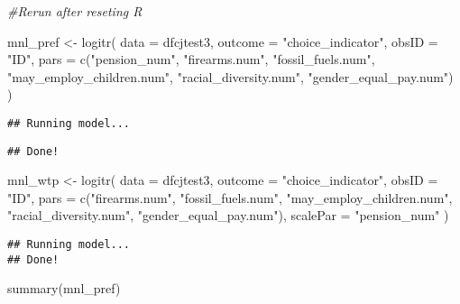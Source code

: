 \documentclass[
]{article}
\newenvironment{Shaded}{\begin{snugshade}}{\end{snugshade}}
\newcommand{\AttributeTok}[1]{\textcolor[rgb]{0.77,0.63,0.00}{#1}}
\newcommand{\CommentTok}[1]{\textcolor[rgb]{0.56,0.35,0.01}{\textit{#1}}}
\newcommand{\FunctionTok}[1]{\textcolor[rgb]{0.00,0.00,0.00}{#1}}
\newcommand{\NormalTok}[1]{#1}
\newcommand{\OtherTok}[1]{\textcolor[rgb]{0.56,0.35,0.01}{#1}}
\newcommand{\StringTok}[1]{\textcolor[rgb]{0.31,0.60,0.02}{#1}}
\begin{document}
\begin{Shaded}
\begin{Highlighting}[]
\CommentTok{\#Rerun after reseting R}

\NormalTok{mnl\_pref }\OtherTok{\textless{}{-}} \FunctionTok{logitr}\NormalTok{(}
    \AttributeTok{data    =}\NormalTok{ dfcjtest3,}
    \AttributeTok{outcome =} \StringTok{"choice\_indicator"}\NormalTok{,}
    \AttributeTok{obsID   =} \StringTok{"ID"}\NormalTok{,}
    \AttributeTok{pars    =} \FunctionTok{c}\NormalTok{(}\StringTok{"pension\_num"}\NormalTok{,}
                \StringTok{"firearms.num"}\NormalTok{, }
                \StringTok{"fossil\_fuels.num"}\NormalTok{,}
                \StringTok{"may\_employ\_children.num"}\NormalTok{,}
                \StringTok{"racial\_diversity.num"}\NormalTok{,}
                \StringTok{"gender\_equal\_pay.num"}\NormalTok{)}
\NormalTok{)}
\end{Highlighting}
\end{Shaded}

\begin{verbatim}
## Running model...
\end{verbatim}

\begin{verbatim}
## Done!
\end{verbatim}

\begin{Shaded}
\begin{Highlighting}[]
\NormalTok{mnl\_wtp }\OtherTok{\textless{}{-}} \FunctionTok{logitr}\NormalTok{(}
    \AttributeTok{data     =}\NormalTok{ dfcjtest3,}
    \AttributeTok{outcome  =} \StringTok{"choice\_indicator"}\NormalTok{,}
    \AttributeTok{obsID    =} \StringTok{"ID"}\NormalTok{,}
    \AttributeTok{pars     =} \FunctionTok{c}\NormalTok{(}\StringTok{"firearms.num"}\NormalTok{, }
                \StringTok{"fossil\_fuels.num"}\NormalTok{,}
                \StringTok{"may\_employ\_children.num"}\NormalTok{,}
                \StringTok{"racial\_diversity.num"}\NormalTok{,}
                \StringTok{"gender\_equal\_pay.num"}\NormalTok{),}
    \AttributeTok{scalePar =} \StringTok{"pension\_num"}
\NormalTok{)}
\end{Highlighting}
\end{Shaded}

\begin{verbatim}
## Running model...
## Done!
\end{verbatim}

\begin{Shaded}
\begin{Highlighting}[]
\FunctionTok{summary}\NormalTok{(mnl\_pref)}
\end{Highlighting}
\end{Shaded}
\end{document}
